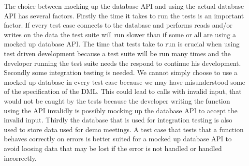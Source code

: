 The choice between mocking up the database API and using the actual database API has several factors.
Firstly the time it takes to run the tests is an important factor.
If every test case connects to the database and performs reads and/or writes on the data the test suite will run slower than if some or all are using a mocked up database API.
The time that tests take to run is crucial when using test driven development because a test suite will be run many times and the developer running the test suite needs the respond to continue his development.
Secondly some integration testing is needed.
We cannot simply choose to use a mocked up database in every test case because we may have misunderstood some of the specification of the \moodle{} DML.
This could lead to calls with invalid input, that would not be caught by the tests because the developer writing the function using the API invalidly is possibly mocking up the database API to accept the invalid input.
Thirdly the database that is used for integration testing is also used to store data used for demo meetings.
A test case that tests that a function behaves correctly on errors is better suited for a mocked up database API to avoid loosing data that may be lost if the error is not handled or handled incorrectly.
\FloatBarrier
